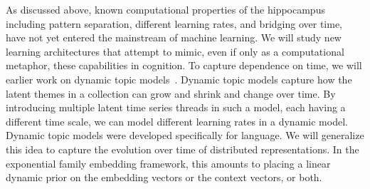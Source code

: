 As discussed above, known computational properties of the hippocampus
including pattern separation, different learning rates, and bridging
over time, have not yet entered the mainstream of machine learning.
We will study new learning architectures that attempt to mimic, even
if only as a computational metaphor, these capabilities in cognition.
To capture dependence on time, we will earlier work on dynamic topic
models~\citep{Blei:2006d}.  Dynamic topic models capture how the
latent themes in a collection can grow and shrink and change over
time.  By introducing multiple latent time series threads in such a
model, each having a different time scale, we can model different
learning rates in a dynamic model.  Dynamic topic models were
developed specifically for language.  We will generalize this idea to
capture the evolution over time of distributed representations.  In
the exponential family embedding framework, this amounts to placing a
linear dynamic prior on the embedding vectors or the context vectors,
or both.
